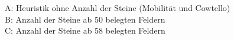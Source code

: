 \small{
A: Heuristik ohne Anzahl der Steine (Mobilität und Cowtello) \\
B: Anzahl der Steine ab 50 belegten Feldern \\
C: Anzahl der Steine ab 58 belegten Feldern}

\pagebreak

